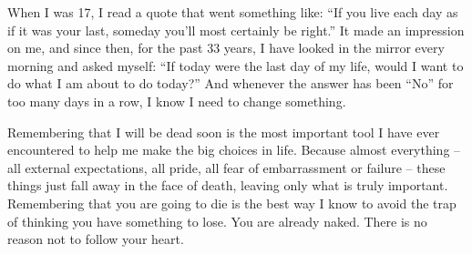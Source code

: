 When I was 17, I read a quote that went something like: “If you live each day as if it was your last, someday you'll most certainly be right.” It made an impression on me, and since then, for the past 33 years, I have looked in the mirror every morning and asked myself: “If today were the last day of my life, would I want to do what I am about to do today?” And whenever the answer has been “No” for too many days in a row, I know I need to change something.

Remembering that I will be dead soon is the most important tool I have ever encountered to help me make the big choices in life. Because almost everything – all external expectations, all pride, all fear of embarrassment or failure – these things just fall away in the face of death, leaving only what is truly important. Remembering that you are going to die is the best way I know to avoid the trap of thinking you have something to lose. You are already naked. There is no reason not to follow your heart.